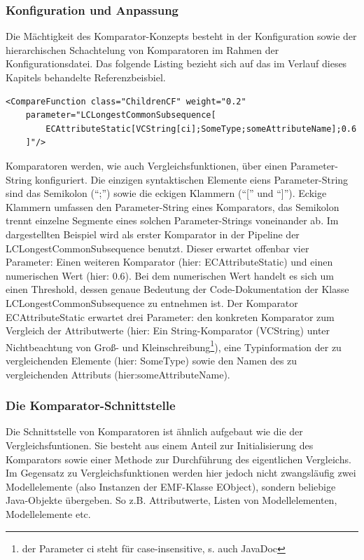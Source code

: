 \documentclass[10pt,a4paper]{scrartcl}
\begin{document}
\subsubsection{Konfiguration und Anpassung}
\label{comparator-configuration}
Die Mächtigkeit des Komparator-Konzepts besteht in der Konfiguration sowie der hierarchischen
Schachtelung von Komparatoren im Rahmen der Konfigurationsdatei. Das folgende Listing bezieht sich
auf das im Verlauf dieses Kapitels behandelte Referenzbeisbiel.

\begin{lstlisting}
<CompareFunction class="ChildrenCF" weight="0.2" 
	parameter="LCLongestCommonSubsequence[
		ECAttributeStatic[VCString[ci];SomeType;someAttributeName];0.6
	]"/>
\end{lstlisting}

Komparatoren werden, wie auch Vergleichsfunktionen, über einen Parameter-String konfiguriert. Die
einzigen syntaktischen Elemente eiens Parameter-String sind das Semikolon (``;'') sowie die eckigen
Klammern (``['' und ``]''). Eckige Klammern umfassen den Parameter-String eines Komparators, das 
Semikolon trennt einzelne Segmente eines solchen Parameter-Strings voneinander ab. Im dargestellten
Beispiel wird als erster Komparator in der Pipeline der LCLongestCommonSubsequence benutzt.
Dieser erwartet offenbar vier Parameter: Einen weiteren Komparator (hier: ECAttributeStatic) und 
einen numerischen Wert (hier: 0.6). Bei dem numerischen Wert handelt es sich um einen Threshold, 
dessen genaue Bedeutung der Code-Dokumentation der Klasse LCLongestCommonSubsequence zu entnehmen ist.
Der Komparator ECAttributeStatic erwartet drei Parameter: den konkreten Komparator zum Vergleich
der Attributwerte (hier: Ein String-Komparator (VCString) unter Nichtbeachtung von Groß- und 
Kleinschreibung\footnote{der Parameter ci steht für case-insensitive, s. auch JavaDoc}), eine
Typinformation der zu vergleichenden Elemente (hier: SomeType) sowie den Namen des zu vergleichenden
Attributs (hier:someAttributeName).


\subsubsection{Die Komparator-Schnittstelle}
Die Schnittstelle von Komparatoren ist ähnlich aufgebaut wie die der Vergleichsfuntionen.
Sie besteht aus einem Anteil zur Initialisierung des Komparators sowie einer Methode zur
Durchführung des eigentlichen Vergleichs. Im Gegensatz zu Vergleichsfunktionen werden hier jedoch
nicht zwangsläufig zwei Modellelemente (also Instanzen der EMF-Klasse EObject), sondern beliebige
Java-Objekte übergeben. So z.B. Attributwerte, Listen von Modellelementen, Modellelemente etc.
\end{document}
